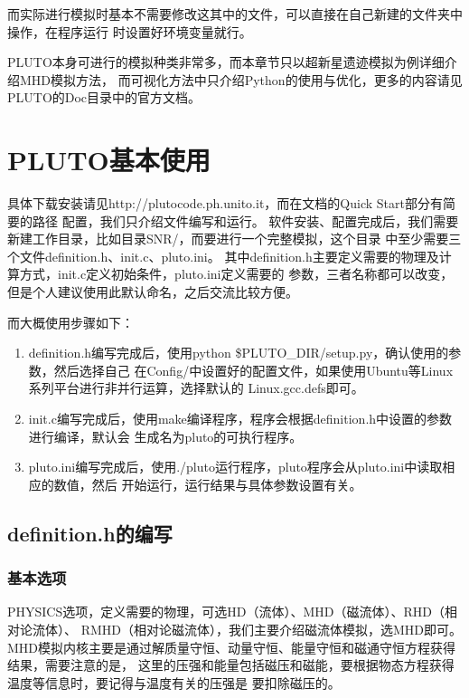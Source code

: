而实际进行模拟时基本不需要修改这其中的文件，可以直接在自己新建的文件夹中操作，在程序运行
时设置好环境变量就行。

PLUTO本身可进行的模拟种类非常多，而本章节只以超新星遗迹模拟为例详细介绍MHD模拟方法，
而可视化方法中只介绍Python的使用与优化，更多的内容请见PLUTO的Doc目录中的官方文档。

\section{PLUTO基本使用}
\label{PLUTOuse}
具体下载安装请见http://plutocode.ph.unito.it，而在文档的Quick Start部分有简要的路径
配置，我们只介绍文件编写和运行。
软件安装、配置完成后，我们需要新建工作目录，比如目录SNR/，而要进行一个完整模拟，这个目录
中至少需要三个文件definition.h、init.c、pluto.ini。
其中definition.h主要定义需要的物理及计算方式，init.c定义初始条件，pluto.ini定义需要的
参数，三者名称都可以改变，但是个人建议使用此默认命名，之后交流比较方便。

而大概使用步骤如下：
\begin{enumerate}

    \item definition.h编写完成后，使用python \$PLUTO\_DIR/setup.py，确认使用的参数，然后选择自己
    在Config/中设置好的配置文件，如果使用Ubuntu等Linux系列平台进行非并行运算，选择默认的
    Linux.gcc.defs即可。

    \item init.c编写完成后，使用make编译程序，程序会根据definition.h中设置的参数进行编译，默认会
    生成名为pluto的可执行程序。

    \item pluto.ini编写完成后，使用./pluto运行程序，pluto程序会从pluto.ini中读取相应的数值，然后
    开始运行，运行结果与具体参数设置有关。

\end{enumerate}

\subsection{definition.h的编写}
\subsubsection{基本选项}

PHYSICS选项，定义需要的物理，可选HD（流体）、MHD（磁流体）、RHD（相对论流体）、
RMHD（相对论磁流体），我们主要介绍磁流体模拟，选MHD即可。
MHD模拟内核主要是通过解质量守恒、动量守恒、能量守恒和磁通守恒方程获得结果，需要注意的是，
这里的压强和能量包括磁压和磁能，要根据物态方程获得温度等信息时，要记得与温度有关的压强是
要扣除磁压的。

